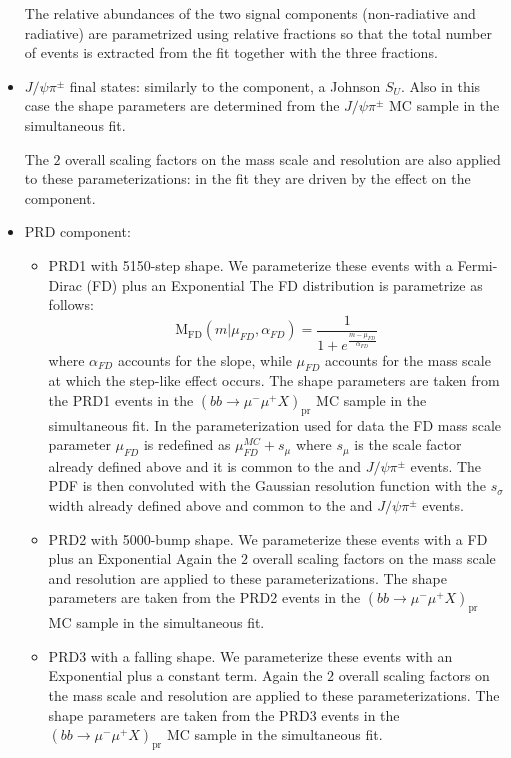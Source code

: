 \begin{itemize}
	The relative abundances of the two signal components (non-radiative
	and radiative) are parametrized using relative fractions so that
	the total number of \BpmKpmJpsi{} events is extracted from the fit
	together with the three fractions.

    \item $J/\psi\pi^\pm$ final states:
	similarly to the \BpmKpmJpsi{} component, a Johnson $S_U$. 
	Also in this case the shape parameters are determined
	from the $J/\psi\pi^\pm$ MC sample in the simultaneous fit.

	The $2$ overall scaling factors on the mass scale and resolution
	are also applied to these parameterizations: in the fit they are
	driven by the effect on the \BpmKpmJpsi{} component.

    \item PRD component:
	\begin{itemize}
	    \setlength{\itemsep}{0pt}%
		\setlength{\parskip}{0pt}%
	    \item PRD1 with 5150-step shape.
		We parameterize these events with a Fermi-Dirac (FD) plus an Exponential
		The FD distribution is parametrize as follows:
		\[
		    \mathrm{M_{FD}}(m|\mu_{FD}, \alpha_{FD})=\frac{1}{1+e^{\frac{m - \mu_{FD}}{\alpha_{FD}}}}
		\]
		where $\alpha_{FD}$ accounts for the slope, while $\mu_{FD}$ accounts for
		the mass scale at which the step-like effect occurs.
		The shape parameters are taken from the PRD1 events in the
		$(bb\to\mu^-\mu^+X)_{\mathrm{pr}}$ MC sample in the simultaneous fit.
		In the parameterization used for data the FD mass scale parameter $\mu_{FD}$
		is redefined as $\mu^{MC}_{FD} + s_\mu$ where $s_\mu$ is the scale factor
		already defined above and it is common to the \BpmKpmJpsi{} and $J/\psi\pi^\pm$ events.
		The PDF is then convoluted with the Gaussian resolution function
		with the $s_\sigma$ width already defined above and common to the \BpmKpmJpsi{}
		and $J/\psi\pi^\pm$ events.

	    \item PRD2 with 5000-bump shape.
		We parameterize these events with a FD plus an Exponential
		Again the $2$ overall scaling factors on
		the mass scale and resolution are applied to these parameterizations.
		The shape parameters are taken from the PRD2 events in the
		$(bb\to\mu^-\mu^+X)_{\mathrm{pr}}$ MC sample in the simultaneous fit.

	    \item PRD3 with a falling shape.
		We parameterize these events with an Exponential plus a constant term.
		Again the $2$ overall scaling factors on
		the mass scale and resolution are applied to these parameterizations.
		The shape parameters are taken from the PRD3 events in the
		$(bb\to\mu^-\mu^+X)_{\mathrm{pr}}$ MC sample in the simultaneous fit.


\end{itemize}
\end{itemize}
